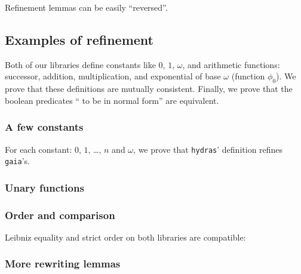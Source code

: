 
Refinement lemmas can be easily ``reversed''.


\subsection{Examples of refinement}
Both of our libraries define constants like $0$, $1$, $\omega$, and arithmetic functions: successor, addition, multiplication, and exponential of base $\omega$ (function $\phi_0$). We prove that these definitions are mutually consistent. Finally, we prove that the boolean predicates `` to be in normal form'' are equivalent.

\subsubsection{A few constants}
For each constant: $0$, $1$, \dots, $n$ and $\omega$, we prove
that \texttt{hydras}' definition refines \texttt{gaia}'s.


\subsubsection{Unary functions}


\subsubsection{Order and comparison}
\label{sect:lt-compat-gaia}
Leibniz equality and strict order on both libraries are
compatible:



\label{sect:gaia-compare-ref}



\subsubsection{More rewriting lemmas}


